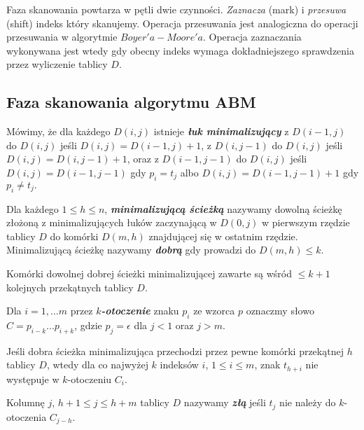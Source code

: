 Faza skanowania powtarza w pętli dwie czynności. \textit{Zaznacza} (mark) i \textit{przesuwa} (shift) indeks który skanujemy. Operacja przesuwania jest analogiczna do operacji przesuwania w algorytmie $Boyer'a-Moore'a$. Operacja zaznaczania wykonywana jest wtedy gdy obecny indeks wymaga dokładniejszego sprawdzenia przez wyliczenie tablicy $D.$

\subsection{Faza skanowania algorytmu ABM}
\begin{definition}{}{}
    Mówimy, że dla każdego $D(i,j)$ istnieje {\bf \textit{łuk minimalizujący}} z $D(i-1, j)$ do $D(i, j)$ jeśli $D(i,j) = D(i - 1, j)+1$, z $D(i, j-1)$ do $D(i, j)$ jeśli $D(i,j) = D(i, j-1)+1$, oraz z $D(i-1,j-1)$ do $D(i, j)$ jeśli $D(i,j) = D(i-1, j-1)$ gdy $p_i = t_j$ albo
    $D(i,j) = D(i-1, j-1) + 1$ gdy $p_i \neq t_j.$
\end{definition}
\begin{definition}{}{}
    Dla każdego $1 \le h \le n$, {\bf \textit{minimalizującą ścieżką}} nazywamy dowolną ścieżkę złożoną z minimalizujących łuków zaczynającą w $D(0,j)$ w pierwszym rzędzie tablicy $D$ do komórki $D(m, h)$ znajdującej się w ostatnim rzędzie. Minimalizującą ścieżkę nazywamy {\bf \textit{dobrą}} gdy prowadzi do $D(m, h) \leq k.$
\end{definition}
\begin{lemma}{}{}
    Komórki dowolnej dobrej ścieżki minimalizującej zawarte są wśród $\leq k+1$ kolejnych przekątnych tablicy $D.$
\end{lemma}
\begin{definition}{}{}
    Dla $i = 1,...m$ przez {\bf \textit{$k$-otoczenie}} znaku $p_i$ ze wzorca $p$ oznaczmy słowo $C = p_{i-k}...p_{i+k}$, gdzie $p_j = \epsilon$ dla $j < 1$ oraz $j > m.$
\end{definition}
\begin{lemma}{}{}
    \label{min-diag}
   Jeśli dobra ścieżka minimalizująca przechodzi przez pewne komórki przekątnej $h$ tablicy $D$, wtedy dla co najwyżej $k$ indeksów $i$, $1 \leq i \leq m$, znak $t_{h+i}$ nie występuje w $k$-otoczeniu $C_i.$
\end{lemma}

\begin{definition}{}{}
    Kolumnę $j$, $h+1 \leq j \leq h+m$ tablicy $D$ nazywamy {\bf \textit{złą}} jeśli $t_j$ nie należy do $k$-otoczenia $C_{j-h}.$
\end{definition}

